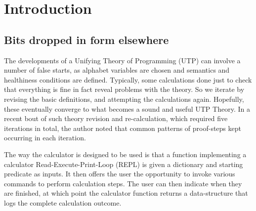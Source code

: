 \section{Introduction}\label{sec:Intro}

\subsection*{Bits dropped in form elsewhere}

The developments of a Unifying Theory of Programming (UTP)
can involve a number of false starts,
as alphabet variables are chosen
and semantics and healthiness conditions are defined.
Typically, some calculations done just to check that everything
is fine in fact reveal problems with the theory.
So we iterate by revising the basic definitions,
and attempting the calculations again.
Hopefully, these eventually converge to what becomes a sound and useful
UTP Theory.
In a recent bout of such theory revision and re-calculation,
which required five iterations in total,
the author noted that common patterns of proof-steps kept occurring
in each iteration.

The way the calculator is designed to be used is
that a function implementing a calculator Read-Execute-Print-Loop (REPL)
is given a dictionary and starting predicate as inputs.
It then offers the user the opportunity to invoke various
commands to perform calculation steps.
The user can then indicate when they are finished,
at which point the calculator function returns
a data-structure that logs the complete calculation outcome.



